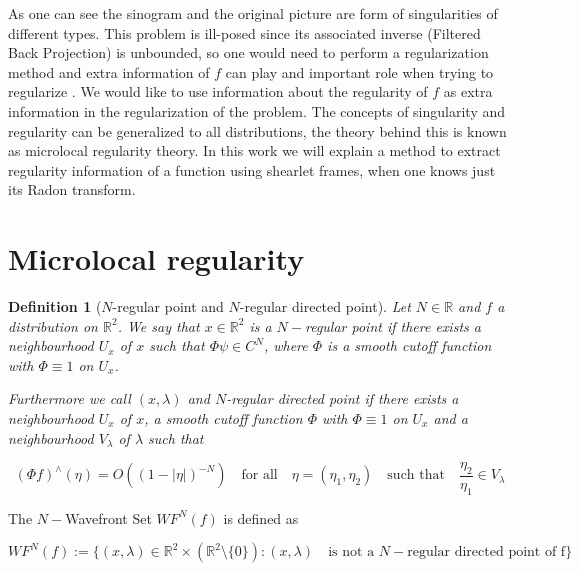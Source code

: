\documentclass[a4paper]{article}
\newtheorem{definition}{Definition}
\begin{document}
\bigskip

As one can see the sinogram and the original picture are form of singularities of different types. This problem is ill-posed since its associated inverse (Filtered Back Projection) is unbounded, so one would need to perform a regularization method and extra information of $f$ can play and important role when trying to regularize \cite{IllPosedDLOektem}. We would like to use information about the regularity of $f$ as extra information in the regularization of the problem. The concepts of singularity and regularity can be generalized to all distributions, the theory behind this is known as microlocal regularity theory. In this work we will explain a method to extract regularity information of a function using shearlet frames, when one knows just its Radon transform. 

\section{Microlocal regularity}

\begin{definition}[$N$-regular point and $N$-regular directed point]
Let $N\in\mathbb{R}$ and $f$ a distribution on $\mathbb{R}^2$. We say that $x\in\mathbb{R}^2$ is a $N-$regular point if there exists a neighbourhood $U_x$ of $x$ such that $\Phi \psi\in C^N$, where $\Phi$ is a smooth cutoff function with $\Phi\equiv 1$ on $U_x$. 

Furthermore we call $(x,\lambda)$ and $N$-regular directed point if there exists a neighbourhood $U_x$ of $x$, a smooth cutoff function $\Phi$ with $\Phi\equiv 1$ on $U_x$ and a neighbourhood $V_{\lambda}$ of $\lambda$ such that

\begin{equation}
\label{eq:N-reg-direc}
(\Phi f)^{\wedge}(\eta)=O((1-|\eta|)^{-N}) \quad\text{for all}\quad \eta=(\eta_1,\eta_2)\quad \text{such that}\quad \frac{\eta_2}{\eta_1}\in V_{\lambda}
\end{equation}
\end{definition}

\bigskip

The $N-$Wavefront Set $WF^N(f)$ is defined as

\begin{equation}
\label{eq:N-wavefront-set}
WF^N(f):=\{(x,\lambda)\in \mathbb{R}^2\times(\mathbb{R}^2\setminus\{0\}): (x,\lambda)\quad \text{is not a $N-$regular directed point of f}\}
\end{equation}
\end{document}

